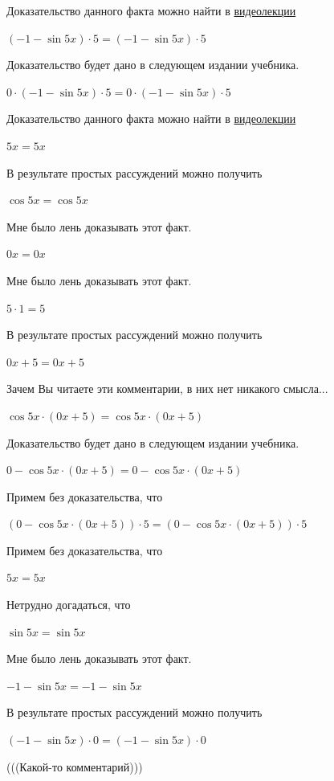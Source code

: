 \documentclass[12pt,a4paper,fleqn]{article}
\theoremstyle{definition}
\begin{document}
Доказательство данного факта можно найти в \href{https://www.youtube.com/watch?v=dQw4w9WgXcQ}{видеолекции} 

$( -1  - \sin 5  x ) \cdot  5  = ( -1  - \sin 5  x ) \cdot  5 $

Доказательство будет дано в следующем издании учебника. 

$ 0  \cdot ( -1  - \sin 5  x ) \cdot  5  =  0  \cdot ( -1  - \sin 5  x ) \cdot  5 $

Доказательство данного факта можно найти в \href{https://www.youtube.com/watch?v=dQw4w9WgXcQ}{видеолекции} 

$ 5  x  =  5  x $

В результате простых рассуждений можно получить 

$\cos 5  x  = \cos 5  x $

Мне было лень доказывать этот факт.

$ 0  x  =  0  x $

Мне было лень доказывать этот факт.

$ 5  \cdot  1  =  5 $

В результате простых рассуждений можно получить 

$ 0  x  +  5  =  0  x  +  5 $

Зачем Вы читаете эти комментарии, в них нет никакого смысла... 

$\cos 5  x  \cdot ( 0  x  +  5 ) = \cos 5  x  \cdot ( 0  x  +  5 )$

Доказательство будет дано в следующем издании учебника. 

$ 0  - \cos 5  x  \cdot ( 0  x  +  5 ) =  0  - \cos 5  x  \cdot ( 0  x  +  5 )$

Примем без доказательства, что 

$( 0  - \cos 5  x  \cdot ( 0  x  +  5 )) \cdot  5  = ( 0  - \cos 5  x  \cdot ( 0  x  +  5 )) \cdot  5 $

Примем без доказательства, что 

$ 5  x  =  5  x $

Нетрудно догадаться, что 

$\sin 5  x  = \sin 5  x $

Мне было лень доказывать этот факт.

$ -1  - \sin 5  x  =  -1  - \sin 5  x $

В результате простых рассуждений можно получить 

$( -1  - \sin 5  x ) \cdot  0  = ( -1  - \sin 5  x ) \cdot  0 $

(((Какой-то комментарий))) 
\end{document}
